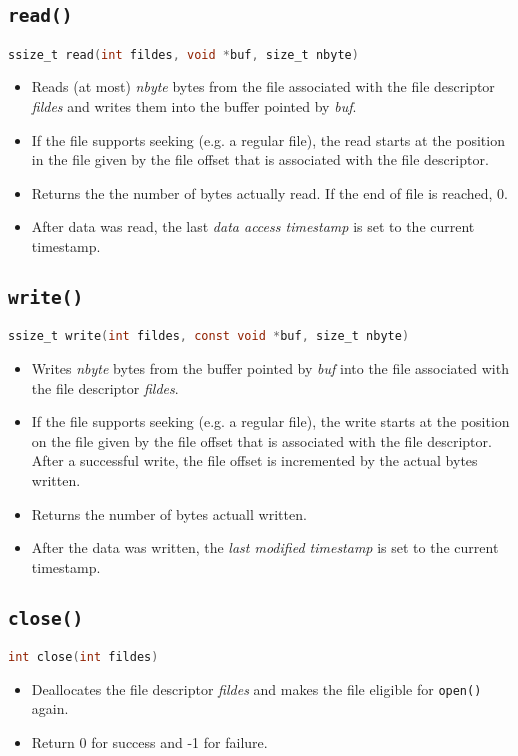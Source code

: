 \documentclass[a4paper, 11pt, accentcolor = tud3b]{tudreport}
\begin{document}
            \subsection{\texttt{read()}}
                \lstinline[language = C]|ssize_t read(int fildes, void *buf, size_t nbyte)|
                \begin{itemize}
                	\item Reads (at most) \textit{nbyte} bytes from the file associated with the file descriptor \textit{fildes} and writes them into the buffer pointed by \textit{buf}.
                	\item If the file supports seeking (e.g. a regular file), the read starts at the position in the file given by the file offset that is associated with the file descriptor.
                	\item Returns the the number of bytes actually read. If the end of file is reached, 0.
                	\item After data was read, the last \textit{data access timestamp} is set to the current timestamp.
                \end{itemize}

            \subsection{\texttt{write()}}
                \lstinline[language = C]|ssize_t write(int fildes, const void *buf, size_t nbyte)|
                \begin{itemize}
                	\item Writes \textit{nbyte} bytes from the buffer pointed by \textit{buf} into the file associated with the file descriptor \textit{fildes}.
                	\item If the file supports seeking (e.g. a regular file), the write starts at the position on the file given by the file offset that is associated with the file descriptor. After a successful write, the file offset is incremented by the actual bytes written.
                	\item Returns the number of bytes actuall written.
                	\item After the data was written, the \textit{last modified timestamp} is set to the current timestamp.
                \end{itemize}

            \subsection{\texttt{close()}}
                \lstinline[language = C]|int close(int fildes)|
                \begin{itemize}
                	\item Deallocates the file descriptor \textit{fildes} and makes the file eligible for \texttt{open()} again.
                	\item Return 0 for success and -1 for failure.
                \end{itemize}
\end{document}
